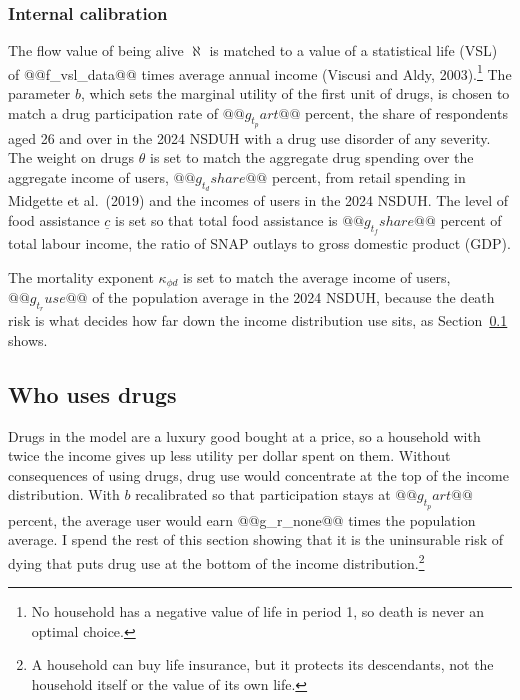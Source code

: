 \documentclass[10pt]{article}
\begin{document}
\subsubsection{Internal calibration}

The flow value
of being alive $\aleph$ is matched to a value of a statistical life (VSL) of @@f_vsl_data@@
times average annual income (Viscusi and Aldy, 2003).\footnote{No household has a negative value of life in period 1, so death is never an optimal choice.} The parameter $b$, which sets the marginal utility of the first unit of drugs, is chosen to match a drug participation rate of
$@@g_t_part@@$ percent, the share of respondents aged 26 and over in the 2024 NSDUH with a drug use disorder of any severity. The weight on drugs $\theta$ is set to match the aggregate drug spending over the
aggregate income of users, $@@g_t_dshare@@$ percent, from retail spending in Midgette et al.\ (2019) and the incomes of users in
the 2024 NSDUH. The level of food assistance $\underline c$ is set so that total food assistance is $@@g_t_fshare@@$ percent of total labour income, the ratio of SNAP outlays to gross domestic product (GDP).

The mortality exponent $\kappa_{\phi d}$ is set to match the average income of users,
$@@g_t_ruse@@$ of the population average in the 2024 NSDUH, because the death risk is what decides how far down
the income distribution use sits, as Section~\ref{sec:who} shows.

\begin{table}[!tb]
\centering
\caption{Externally set parameters}\label{tab:ext}
\sbox{\ntbox}{}\usebox{\ntbox}
\end{table}

\begin{table}[!tb]
\centering
\caption{Internally calibrated parameters}\label{tab:int}
\sbox{\ntbox}{}\usebox{\ntbox}
\end{table}

\subsection{Who uses drugs}\label{sec:who}

Drugs in the model are a luxury good bought at a price, so a household with
twice the income gives up less utility per dollar spent on them.   Without consequences of using drugs, drug use would concentrate at the top of the income distribution. With $b$ recalibrated so that participation stays at $@@g_t_part@@$ percent, the average user would earn @@g_r_none@@ times the population average. I spend the rest of this section showing that it is the uninsurable risk of dying that puts drug use at the bottom of the income distribution.\footnote{A household can buy life insurance, but it protects its descendants, not the household itself or the value of its own life.}
\end{document}
